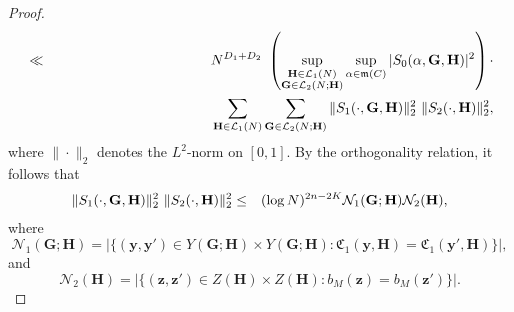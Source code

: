 \documentclass[12pt]{amsart}
\theoremstyle{definition}
\theoremstyle{remark}
\numberwithin{equation}{section}
\begin{document}
\begin{proof}
\begin{eqnarray}
&\ll&
N^{D_1+D_2} \  \left( \sup_{\substack {\mathbf{H} \in \mathcal{L}_1(N) \\ \mathbf{G} \in \mathcal{L}_2(N ; \mathbf{H}) }}  \sup_{\alpha \in \mathfrak{m}(C) } | S_0 (\alpha, \mathbf{G}, \mathbf{H} ) |^2 \right) \cdot
\notag
\\
&&\phantom{1223344556677889123456}  \sum_{\mathbf{H} \in \mathcal{L}_1(N)} \sum_{\mathbf{G} \in \mathcal{L}_2(N ; \mathbf{H})}   \|S_1(\cdot, \mathbf{G}, \mathbf{H} ) \|_2^2 \ \| S_2(\cdot, \mathbf{H} ) \|_2^2,
\notag
\end{eqnarray}
where $\| \cdot \|_2$ denotes the $L^2$-norm on $[0,1]$.
By the orthogonality relation, it follows that
\begin{eqnarray}
\notag
\|S_1(\cdot, \mathbf{G}, \mathbf{H} ) \|_2^2 \ \| S_2(\cdot, \mathbf{H} ) \|_2^2
&\leq&
(\log N)^{2n - 2K} \mathcal{N}_1 (\mathbf{G}; \mathbf{H}) \mathcal{N}_2 (\mathbf{H}),
\notag
\end{eqnarray}
where
$$\mathcal{N}_1 (\mathbf{G}; \mathbf{H}) =  | \{ (\mathbf{y}, \mathbf{y}' )  \in Y(\mathbf{G}; \mathbf{H}) \times Y(\mathbf{G}; \mathbf{H}): \mathfrak{C}_1 (\mathbf{y}, \mathbf{H}  ) = \mathfrak{C}_1 (\mathbf{y}', \mathbf{H}  )   \} |,$$
and
$$
\mathcal{N}_2 (\mathbf{H}) =  |\{ (\mathbf{z}, \mathbf{z}' )  \in Z(\mathbf{H}) \times Z(\mathbf{H}) : {b}_M( \mathbf{z} ) = {b}_M( \mathbf{z}' ) \}|.
$$


\end{proof}
\end{document}
